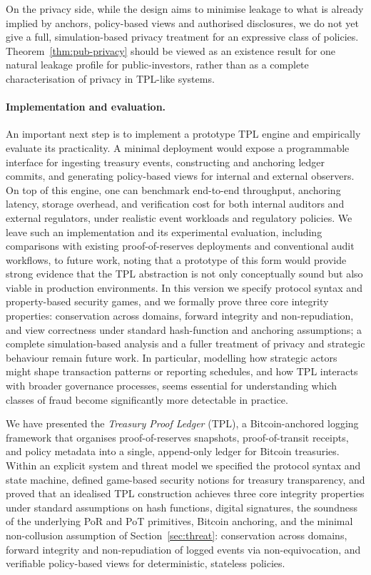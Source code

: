 \documentclass[11pt]{article}
\begin{document}
On the privacy side, while the design aims to minimise leakage to what is already implied by anchors,
policy-based views and authorised disclosures, we do not yet give a full, simulation-based privacy
treatment for an expressive class of policies.
Theorem~\ref{thm:pub-privacy} should be viewed as an existence result for one natural leakage profile
for public-investors, rather than as a complete characterisation of privacy in TPL-like systems.

\paragraph{Implementation and evaluation.}
An important next step is to implement a prototype TPL engine and empirically evaluate its practicality.
A minimal deployment would expose a programmable interface for ingesting treasury events, constructing and anchoring ledger commits, and generating policy-based views for internal and external observers.
On top of this engine, one can benchmark end-to-end throughput, anchoring latency, storage overhead, and verification cost for both internal auditors and external regulators, under realistic event workloads and regulatory policies.
We leave such an implementation and its experimental evaluation, including comparisons with existing proof-of-reserves deployments and conventional audit workflows, to future work, noting that a prototype of this form would provide strong evidence that the TPL abstraction is not only conceptually sound but also viable in production environments.
In this version we specify protocol syntax and property-based security games, and we formally prove three core integrity properties: conservation across domains, forward integrity and non-repudiation, and view correctness under standard hash-function and anchoring assumptions; a complete simulation-based analysis and a fuller treatment of privacy and strategic behaviour remain future work.
In particular, modelling how strategic actors might shape transaction patterns or reporting schedules, and how TPL interacts with broader governance processes, seems essential for understanding which classes of fraud become significantly more detectable in practice.

We have presented the \emph{Treasury Proof Ledger} (TPL), a Bitcoin-anchored logging framework that
organises proof-of-reserves snapshots, proof-of-transit receipts, and policy metadata into a single,
append-only ledger for Bitcoin treasuries.
Within an explicit system and threat model we specified the protocol syntax and state machine, defined
game-based security notions for treasury transparency, and proved that an idealised TPL construction
achieves three core integrity properties under standard assumptions on hash functions, digital signatures,
the soundness of the underlying PoR and PoT primitives, Bitcoin anchoring, and the minimal non-collusion assumption of Section~\ref{sec:threat}: conservation across domains, forward integrity and non-repudiation of logged events
via non-equivocation, and verifiable policy-based views for deterministic, stateless policies.
\end{document}
